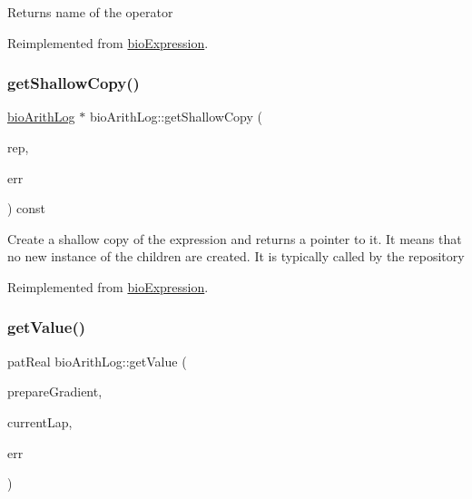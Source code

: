 \begin{DoxyReturn}{Returns}
name of the operator 
\end{DoxyReturn}


Reimplemented from \hyperlink{classbio_expression_a2353a4afb3a2b0af7c63aba086a72bde}{bio\+Expression}.

\mbox{\label{classbio_arith_log_aff0739f0c0576b9e70b7192e3e5baf2a}} 
\subsubsection{\texorpdfstring{get\+Shallow\+Copy()}{getShallowCopy()}}
{\footnotesize\ttfamily \hyperlink{classbio_arith_log}{bio\+Arith\+Log} $\ast$ bio\+Arith\+Log\+::get\+Shallow\+Copy (\begin{DoxyParamCaption}\item[{\hyperlink{classbio_expression_repository}{bio\+Expression\+Repository} $\ast$}]{rep,  }\item[{pat\+Error $\ast$\&}]{err }\end{DoxyParamCaption}) const\hspace{0.3cm}{\ttfamily [virtual]}}

Create a shallow copy of the expression and returns a pointer to it. It means that no new instance of the children are created. It is typically called by the repository 

Reimplemented from \hyperlink{classbio_expression_a442534762693b92baaf33928979a1bf8}{bio\+Expression}.

\mbox{\label{classbio_arith_log_a31c9d372354ff2f971caffc594c555a9}} 
\subsubsection{\texorpdfstring{get\+Value()}{getValue()}}
{\footnotesize\ttfamily pat\+Real bio\+Arith\+Log\+::get\+Value (\begin{DoxyParamCaption}\item[{pat\+Boolean}]{prepare\+Gradient,  }\item[{pat\+U\+Long}]{current\+Lap,  }\item[{pat\+Error $\ast$\&}]{err }\end{DoxyParamCaption})\hspace{0.3cm}{\ttfamily [virtual]}}


